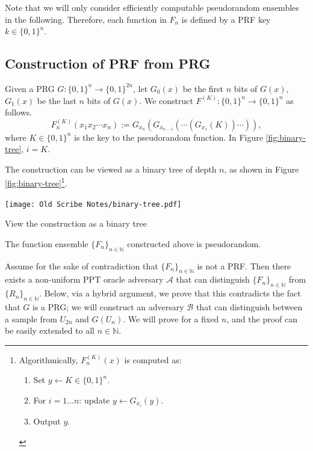 \documentclass[12pt]{tufte-book}
\newcommand{\ma}{\mathcal{A}}
\begin{document}
Note that we will only consider efficiently computable pseudorandom ensembles in the following. Therefore, each function in $F_n$ is defined by a PRF key $k \in \{0, 1\}^n$.


\subsection{Construction of PRF from PRG}

\begin{construction}
    Given a PRG $G: \{0, 1\}^n \rightarrow \{0, 1\}^{2n}$,
    let $G_0(x)$ be the first $n$ bits of $G(x)$, $G_1(x)$ be the last $n$ bits of $G(x)$.
    We construct $F^{(K)}: \{0, 1\}^n \rightarrow \{0, 1\}^n$ as follows.
    \[
        F^{(K)}_n(x_1 x_2 \cdots x_n) := G_{x_n}(G_{x_{n-1}} (\cdots(G_{x_1}(K)) \cdots  )),
    \]
    where $K \in \{0,1\}^n$ is the key to the pseudorandom function. In Figure \ref{fig:binary-tree}, $i = K$.
\end{construction}
The construction can be viewed as a binary tree of depth $n$, as shown in Figure \ref{fig:binary-tree}\footnote{Algorithmically, $F_n^{(K)}(x)$ is computed as:
\begin{enumerate}
    \item Set $y \gets K \in \{0, 1\}^n$.
    \item For $i = 1 \dots n$: update $y \gets G_{x_i}(y)$.
    \item Output $y$.
\end{enumerate}
}.

\begin{marginfigure}
    \centering
    \texttt{[image: Old Scribe Notes/binary-tree.pdf]}
    \caption{View the construction as a binary tree}
    \label{fig:binary-tree}
\end{marginfigure}

\begin{theorem}\label{theorem:ggm}
    The function ensemble $\{F_n\}_{n \in \mathbb{N}}$ constructed above is pseudorandom.
\end{theorem}

\proof
Assume for the sake of contradiction that $\{F_n\}_{n \in \mathbb{N}}$ is not a PRF.
Then there exists a non-uniform PPT oracle adversary $\ma$ that can distinguish $\{F_n\}_{n \in \mathbb{N}}$ from $\{R_n\}_{n \in \mathbb{N}}$. Below, via a hybrid argument, we prove that this contradicts the fact that $G$ is a PRG; we will construct an adversary $\mathcal{B}$ that can distinguish between a sample from $U_{2n}$ and $G(U_{n})$. We will prove for a fixed $n$, and the proof can be easily extended to all $n \in \mathbb{N}$.\smallskip
\end{document}
